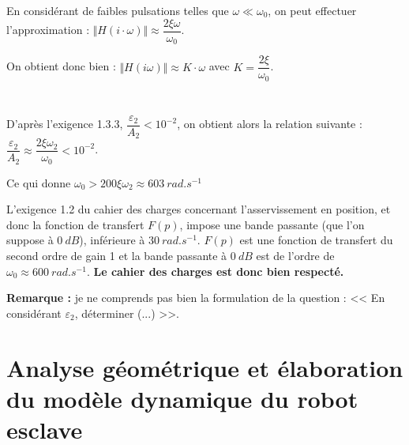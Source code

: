 \documentclass[10pt,fleqn]{article} %
\begin{document}
En considérant de faibles pulsations telles que $\omega\ll \omega_0$, on peut effectuer l'approximation : 
$\Vert H(i\cdot \omega)\Vert\approx\dfrac{2\xi\omega}{\omega_0}$.

On obtient donc bien : $\Vert H(i\omega)\Vert\approx K\cdot \omega $  avec $K=\dfrac{2\xi}{\omega_0}$.


\subparagraph{}	~\\
D'après l'exigence 1.3.3, $\dfrac{\varepsilon_2}{A_2}<10^{-2}$, on obtient alors la relation suivante : $
\dfrac{\varepsilon_2}{A_2}\approx \dfrac{2\xi\omega_2}{\omega_0}<10^{-2}$.  

Ce qui donne $\omega_0>200\xi\omega_2\approx \SI{603}{rad.s^{-1}}$

L'exigence 1.2 du cahier des charges concernant l'asservissement en position, et donc la fonction de transfert $F(p)$, impose une bande passante (que l'on suppose à $\SI{0}{dB}$), inférieure à $\SI{30}{rad.s^{-1}}$. $F(p)$ est une fonction de transfert du second ordre de gain 1 et la bande passante à $\SI{0}{dB}$ est de l'ordre de $\omega_0\approx \SI{600}{rad.s^{-1}}$. \textbf{Le cahier des charges est donc bien respecté.}





\textbf{Remarque :} je ne comprends pas bien la formulation de la question : << En considérant $\varepsilon_2$, déterminer (...) >>.


\section{Analyse géométrique et élaboration du modèle dynamique du robot esclave}
\end{document}
